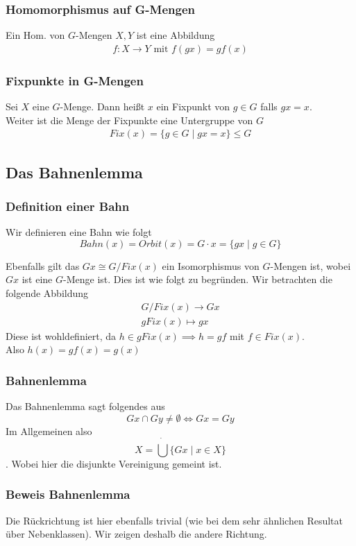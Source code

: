 \documentclass[12pt, german]{article}
\begin{document}
\subsubsection{Homomorphismus auf G-Mengen}
	Ein Hom. von $G$-Mengen $X,Y$ ist eine Abbildung 
	\begin{align*}
		f: X \to Y \text{ mit } f(gx) = gf(x)
	\end{align*}

\subsubsection{Fixpunkte in G-Mengen}
	Sei $X$ eine  $G$-Menge. Dann heißt $x$ ein Fixpunkt von $g \in G$ falls $gx=x$. \\
	Weiter ist die Menge der Fixpunkte eine Untergruppe von $G$
	\begin{align*}
		Fix(x) = \{g \in G \mid  gx = x\} \leq G 
	\end{align*}


\subsection{Das Bahnenlemma}		
\subsubsection{Definition einer Bahn}
	Wir definieren eine Bahn wie folgt $$Bahn(x) = Orbit(x) = G\cdot x = \{gx \mid  g \in G \}$$
	
	
	Ebenfalls gilt das $Gx \cong G/Fix(x)$ ein Isomorphismus von $G$-Mengen ist, wobei $Gx$ ist eine $G$-Menge ist. 
	Dies ist wie folgt zu begründen. Wir betrachten die folgende Abbildung
	\begin{align*}
		G/Fix(x) \to Gx \\ 
		gFix(x) \mapsto gx
	 \end{align*}
	 Diese ist wohldefiniert, da $h \in gFix(x) \implies h=gf$ mit $f \in Fix(x)$. \\ 
	 Also $h(x) = gf(x) = g(x)$ 


\subsubsection{Bahnenlemma}
	Das Bahnenlemma sagt folgendes aus $$Gx \cap Gy \not = \emptyset \iff Gx = Gy$$
	Im Allgemeinen also $$ X = \dot{\bigcup} \{Gx \mid  x \in X \}$$. Wobei hier die disjunkte Vereinigung gemeint ist. 
\subsubsection{Beweis Bahnenlemma}
	Die Rückrichtung ist hier ebenfalls trivial (wie bei dem sehr ähnlichen Resultat über Nebenklassen). Wir zeigen deshalb die andere Richtung. \\ 
	
\end{document}
